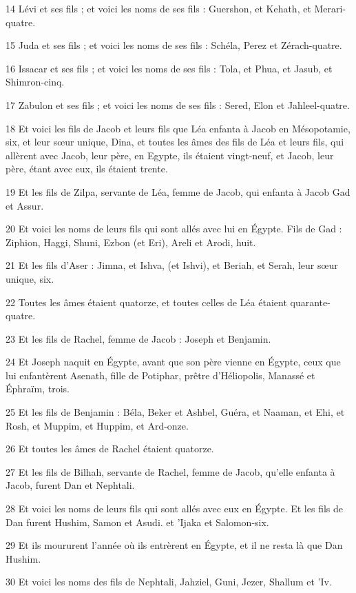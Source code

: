 \par 14 Lévi et ses fils ; et voici les noms de ses fils : Guershon, et Kehath, et Merari-quatre.
\par 15 Juda et ses fils ; et voici les noms de ses fils : Schéla, Perez et Zérach-quatre.
\par 16 Issacar et ses fils ; et voici les noms de ses fils : Tola, et Phua, et Jasub, et Shimron-cinq.
\par 17 Zabulon et ses fils ; et voici les noms de ses fils : Sered, Elon et Jahleel-quatre.
\par 18 Et voici les fils de Jacob et leurs fils que Léa enfanta à Jacob en Mésopotamie, six, et leur sœur unique, Dina, et toutes les âmes des fils de Léa et leurs fils, qui allèrent avec Jacob, leur père, en Egypte, ils étaient vingt-neuf, et Jacob, leur père, étant avec eux, ils étaient trente.
\par 19 Et les fils de Zilpa, servante de Léa, femme de Jacob, qui enfanta à Jacob Gad et Assur.
\par 20 Et voici les noms de leurs fils qui sont allés avec lui en Égypte. Fils de Gad : Ziphion, Haggi, Shuni, Ezbon (et Eri), Areli et Arodi, huit.
\par 21 Et les fils d'Aser : Jimna, et Ishva, (et Ishvi), et Beriah, et Serah, leur sœur unique, six.
\par 22 Toutes les âmes étaient quatorze, et toutes celles de Léa étaient quarante-quatre.
\par 23 Et les fils de Rachel, femme de Jacob : Joseph et Benjamin.
\par 24 Et Joseph naquit en Égypte, avant que son père vienne en Égypte, ceux que lui enfantèrent Asenath, fille de Potiphar, prêtre d'Héliopolis, Manassé et Éphraïm, trois.
\par 25 Et les fils de Benjamin : Béla, Beker et Ashbel, Guéra, et Naaman, et Ehi, et Rosh, et Muppim, et Huppim, et Ard-onze.
\par 26 Et toutes les âmes de Rachel étaient quatorze.
\par 27 Et les fils de Bilhah, servante de Rachel, femme de Jacob, qu'elle enfanta à Jacob, furent Dan et Nephtali.
\par 28 Et voici les noms de leurs fils qui sont allés avec eux en Égypte. Et les fils de Dan furent Hushim, Samon et Asudi. et 'Ijaka et Salomon-six.
\par 29 Et ils moururent l'année où ils entrèrent en Égypte, et il ne resta là que Dan Hushim.
\par 30 Et voici les noms des fils de Nephtali, Jahziel, Guni, Jezer, Shallum et 'Iv.

